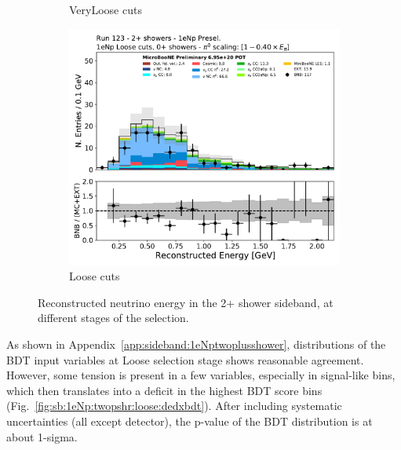 \begin{figure}[H]
\begin{center}
\begin{subfigure}{0.32\textwidth}
    \caption{\npsel VeryLoose cuts}
    \end{subfigure} 
    \begin{subfigure}{0.32\textwidth}
    \includegraphics[width=1.00\textwidth]{Sidebands/Figures/1eNp/TwoShower/TwoPShr_NP_NPLAllShr_pi0e040/reco_e.pdf}
    \caption{\npsel Loose cuts}
    \end{subfigure}
    \caption{\label{fig:sb:1eNp:twopshr:recoe} Reconstructed neutrino energy in the 2+ shower sideband, at different stages of the \npsel selection.}
    \end{center}
\end{figure}

As shown in Appendix~\ref{app:sideband:1eNptwoplusshower}, distributions of the BDT input variables at Loose selection stage shows reasonable agreement. However, some tension is present in a few variables, especially in signal-like bins, which then translates into a deficit in the highest BDT score bins (Fig.~\ref{fig:sb:1eNp:twopshr:loose:dedxbdt}). After including systematic uncertainties (all except detector), the p-value of the BDT distribution is at about 1-sigma.

